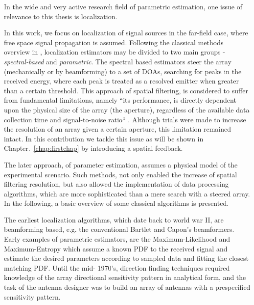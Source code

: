 In the wide and very active research field of parametric estimation, one issue of relevance to this thesis is localization.
\par 
In this work, we focus on localization of signal sources in the far-field case, where free space signal propagation is assumed.
Following the classical methods overview in \cite{krim1996two}, localization estimators may be divided to two main groups - \textit{spectral-based} and \textit{parametric}.
The spectral based estimators steer the array (mechanically or by beamforming) to a set of DOAs, searching for peaks in the received energy, where each peak is treated as a resolved emitter when greater than a certain threshold.
This approach of spatial filtering, is considered to suffer from fundamental
limitations, namely ``its performance, is directly dependent upon the physical size of the array (the aperture), regardless of the available data collection time and signal-to-noise ratio`` \cite{krim1996two}.
Although trials were made to increase the resolution of an array given a certain aperture, this limitation remained intact.
In this contribution we tackle this issue as will be shown in Chapter.~\ref{chap:firstchap} by introducing a spatial feedback.
\par
The later approach, of parameter estimation, assumes a physical model of the experimental scenario.
Such methods, not only enabled the increase of spatial filtering resolution, but also allowed the implementation of data processing algorithms, which are more sophisticated than a mere search with a steered array.
In the following, a basic overview of some classical algorithms is presented.
\par
The earliest localization algorithms, which date back to world war II, are beamforming based, e.g. the conventional Bartlet \cite{van2004optimum} and Capon's \cite{capon1969high} beamformers.
Early examples of parametric estimators, are the Maximum-Likelihood \cite{macdonald1969optimum,schweppe1968sensor} and Maximum-Entropy \cite{ables1974maximum} which assume a known PDF to the received signal and estimate the desired parameters according to sampled data and fitting the closest matching PDF.
Until the mid- 1970's, direction finding techniques required knowledge of the array directional sensitivity pattern in analytical form, and the task of the antenna designer was to build an array of antennas with a prespecified sensitivity pattern.
